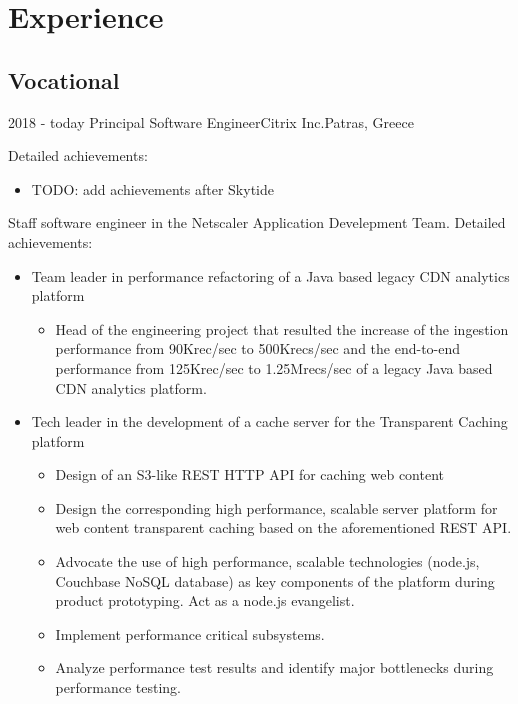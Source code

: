 \documentclass[10pt,a4paper]{moderncv}        %
\begin{document}
\makecvtitle

\section{Experience}

\subsection{Vocational}

\cventry
{2018 - today}
{Principal Software Engineer}{Citrix Inc.}{Patras, Greece}{}
 {%
Detailed achievements:%
\begin{itemize}
  \item
TODO: add achievements after Skytide
\end{itemize}}

{Staff software engineer in the Netscaler Application Develepment Team.\newline{}
Detailed achievements:%
\begin{itemize}
  \item 
  Team leader in performance refactoring of a Java based legacy CDN analytics platform
  \begin{itemize}
    \item Head of the engineering project that resulted 
    the increase of the ingestion performance from 90Krec/sec to 500Krecs/sec 
    and the end-to-end performance from 125Krec/sec to 1.25Mrecs/sec 
    of a legacy Java based CDN analytics platform.
  \end{itemize}
  \item Tech leader in the development of a cache server for the Transparent Caching platform
  \begin{itemize}
    \item Design of an S3-like REST HTTP API for caching web content
    \item Design the corresponding high performance,
    scalable server platform for web content transparent caching
    based on the aforementioned REST API.
    \item Advocate the use of high performance, scalable technologies (node.js, Couchbase NoSQL database) 
    as key components of the platform during product prototyping. 
    Act as a node.js evangelist.
    \item Implement performance critical subsystems.
    \item Analyze performance test results 
    and identify major bottlenecks during performance testing.
  \end{itemize}
\end{itemize}}
\end{document}
